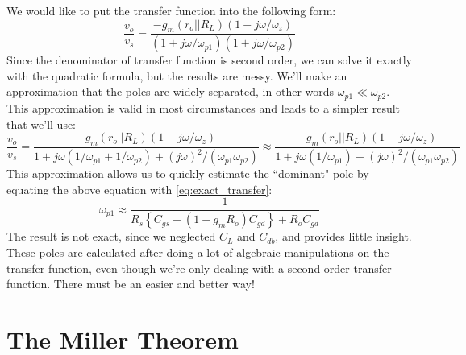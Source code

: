 We would like to put the transfer function into the following form:
\begin{equation}
\frac{v_{o}}{v_{s}} = 
	\frac{ - g_m \left( r_o||R_L \right) \left( 1 - j\omega /\omega_z \right)}
	{\left( 1 + j\omega /\omega_{p1} \right) \left( 1 + j\omega /\omega_{p2} \right) }
\end{equation}
Since the denominator of transfer function is second order, we can solve it exactly with the quadratic formula, but the results are messy.  We'll make an approximation that the poles are widely separated, in other words $\omega_{p1} \ll \omega_{p2}$.  This approximation is valid in most circumstances and leads to a simpler result that we'll use:
\begin{equation}
\frac{v_{o}}{v_{s}} = 
	\frac{ - g_m \left( r_o||R_L \right) \left( 1 - j\omega /\omega_z \right)}
	{ 1 + j\omega \left( 1/\omega_{p1} +  1/\omega_{p2} \right) + (j\omega)^2 / (\omega_{p1}\omega_{p2})   }
	\approx 
	\frac{ - g_m \left( r_o||R_L \right) \left( 1 - j\omega /\omega_z \right)}
	{ 1 + j\omega \left( 1/\omega_{p1}  \right) + (j\omega)^2 / (\omega_{p1}\omega_{p2})   }
\end{equation}
This approximation allows us to quickly estimate the ``dominant" pole by equating the above equation with \ref{eq:exact_transfer}:
\begin{equation} 
{\omega _{p1}} \approx \frac{1}{{{R_s}\left\{ {{C_{gs}} + \left( {1 + {g_m}{{R}_{o}}} \right){C_{gd}}} \right\} + {{R}_{o}}{C_{gd}}}}  \label{eq:pole_almost_exact}
\end{equation}
The result is not exact, since we neglected $C_L$ and $C_{db}$, and provides little insight.  These poles are calculated after doing a lot of algebraic manipulations on the transfer function, even though we're only dealing with a second order transfer function. There must be an easier and better way!
\section{The Miller Theorem}
